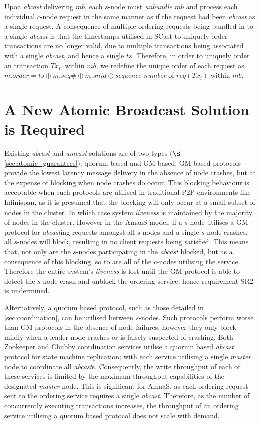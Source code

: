    Upon \emph{abcast} delivering $mb$, each $s$-node must \emph{unbundle} $mb$ and process each individual $c$-node request in the same manner as if the request had been \emph{abcast} as a single request.  A consequence of multiple ordering requests being bundled in to a single \emph{abcast} is that the timestamps utilised in \textsf{SCast} to uniquely order transactions are no longer valid, due to multiple transactions being associated with a single \emph{abcast}, and hence a single $ts$.  Therefore, in order to uniquely order an transaction $Tx_i$, within $mb$, we redefine the unique order of each request as $m.order = ts\oplus m.seq\# \oplus m.snid \oplus$\emph{sequence number} of $req(Tx_i)$ within $mb$.  

\section{A New Atomic Broadcast Solution is Required}
Existing \emph{abcast} and \emph{amcast} solutions are of two types ($\S$ \ref{sec:atomic_guarantees}); quorum based and GM based.  GM based protocols provide the lowest latency message delivery in the absence of node crashes, but at the expense of blocking when node crashes do occur.  This blocking behaviour is acceptable when such protocols are utilised in traditional P2P environments like Infinispan, as it is presumed that the blocking will only occur at a small subset of nodes in the cluster.  In which case system \emph{liveness} is maintained by the majority of nodes in the cluster.  However in the \textsf{AmaaS} model, if a $s$-node utilises a GM protocol for \emph{abcast}ing requests amongst all $s$-nodes and a single $s$-node crashes, all $s$-nodes will block, resulting in no client requests being satisfied. This means that, not only are the $s$-nodes participating in the \emph{abcast} blocked, but as a consequence of this blocking, so to are all of the $c$-nodes utilising the service.  Therefore the entire system's \emph{liveness} is lost until the GM protocol is able to detect the $s$-node crash and unblock the ordering service; hence requirement SR2 is undermined.  

Alternatively, a quorum based protocol, such as those detailed in \ref{sec:coordination}, can be utilised between $s$-nodes.  Such protocols perform worse than GM protocols in the absence of node failures, however they only block mildly when a leader node crashes or is falsely suspected of crashing.  Both Zookeeper and Chubby coordination services utilise a quorum based \emph{abcast} protocol for state machine replication; with each service utilising a single \emph{master} node to coordinate all \emph{abcast}s.  Consequently, the write throughput of each of these services is limited by the maximum throughput capabilities of the designated \emph{master} node.  This is significant for \textsf{AmaaS}, as each ordering request sent to the ordering service requires a single \emph{abcast}.  Therefore, as the number of concurrently executing transactions increases, the throughput of an ordering service utilising a quorum based protocol does not scale with demand.    

